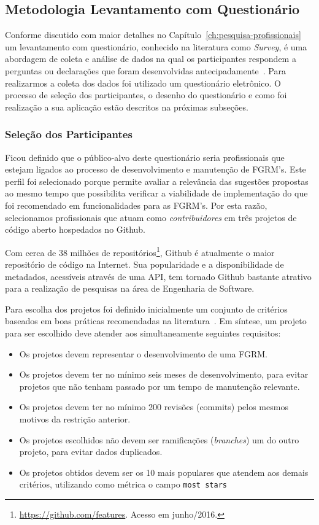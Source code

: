 \subsection{Metodologia Levantamento com Questionário}
\label{sub:sug_melhoria_metodologia_levantamento}

Conforme discutido com maior detalhes no
Capítulo~\ref{ch:pesquisa-profissionais} um levantamento com questionário,
conhecido na literatura como \textit{Survey}, é uma abordagem de coleta e
análise de dados na qual os participantes respondem a perguntas ou declarações
que foram desenvolvidas antecipadamente~\cite{kasunic2005designing}. Para
realizarmos a coleta dos dados foi utilizado um questionário eletrônico. O
processo de seleção dos participantes, o desenho do questionário e como foi
realização a sua aplicação estão descritos na próximas subseções.

\subsubsection{Seleção dos Participantes}
\label{ssub:sug_melhoria_selecao_participantes}

Ficou definido que o público-alvo deste questionário seria profissionais que
estejam ligados ao processo de desenvolvimento e manutenção de FGRM's. Este
perfil foi selecionado porque permite avaliar a relevância das sugestões
propostas ao mesmo tempo que possibilita verificar a viabilidade de
implementação do que foi recomendado em funcionalidades para as FGRM's. Por esta
razão, selecionamos profissionais que atuam como \textit{contribuidores} em três
projetos de código aberto hospedados no Github.

Com cerca de 38 milhões de
repositórios\footnote{\url{https://github.com/features}. Acesso em junho/2016.},
Github é atualmente o maior repositório de código na Internet. Sua popularidade
e a disponibilidade de metadados, acessíveis através de uma API, tem tornado
Github bastante atrativo para a realização de pesquisas na área de Engenharia de
Software.

Para escolha dos projetos foi definido inicialmente um conjunto de critérios
baseados em boas práticas recomendadas na literatura~\cite{Bird2009}. Em
síntese, um projeto para ser escolhido deve atender aos simultaneamente
seguintes requisitos:

\begin{itemize}
	\item Os projetos devem representar o desenvolvimento de uma FGRM\@.
	\item Os projetos devem ter no mínimo seis meses de desenvolvimento, para
		evitar projetos que não tenham passado por um tempo de manutenção
		relevante.
	\item Os projetos devem  ter  no  mínimo  200  revisões (commits)  pelos
		mesmos motivos  da restrição anterior.
	\item Os projetos escolhidos não devem ser ramificações (\textsl{branches}) um
		do outro projeto, para evitar dados duplicados.
	\item Os projetos obtidos devem ser os 10 mais populares que atendem aos
		demais critérios, utilizando como métrica o campo \texttt{most stars}
\end{itemize}


